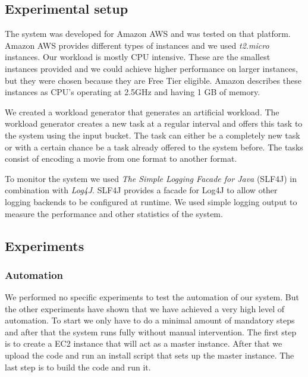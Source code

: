 \documentclass[a4paper]{IEEEtran}
\begin{document}
\subsection{Experimental setup}
The system was developed for Amazon AWS and was tested on that platform.
Amazon AWS provides different types of instances and we used \emph{t2.micro} instances.
Our workload is mostly CPU intensive.
These are the smallest instances provided and we could achieve higher performance on larger instances,
 but they were chosen because they are Free Tier eligible.
Amazon describes these instances as CPU's operating at 2.5GHz and having 1 GB of memory.

We created a workload generator that generates an artificial workload.
The workload generator creates a new task at a regular interval and offers this task to the system using the input bucket.
The task can either be a completely new task or with a certain chance be a task already offered to the system before.
The tasks consist of encoding a movie from one format to another format.

To monitor the system we used \emph{The Simple Logging Facade for Java} (SLF4J) in combination with \emph{Log4J}.
SLF4J provides a facade for Log4J to allow other logging backends to be configured at runtime.
We used simple logging output to measure the performance and other statistics of the system.

\subsection{Experiments}
\subsubsection{Automation}
We performed no specific experiments to test the automation of our system.
But the other experiments have shown that we have achieved a very high level of automation.
To start we only have to do a minimal amount of mandatory steps and after that the system runs fully without manual intervention.
The first step is to create a EC2 instance that will act as a master instance.
After that we upload the code and run an install script that sets up the master instance.
The last step is to build the code and run it.
\end{document}
